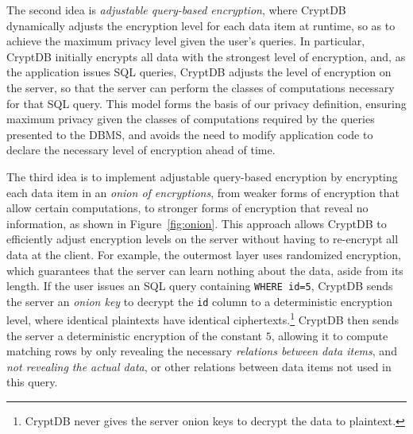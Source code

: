 The second idea is {\em adjustable query-based encryption}, where
CryptDB dynamically adjusts the encryption level for each data
item at runtime, so as to achieve the maximum privacy
level given the user's queries.  In particular, CryptDB initially
encrypts all data with the strongest level of encryption, and,
as the application issues SQL queries, CryptDB adjusts the level
of encryption on the server, so that the server can perform the
classes of computations necessary for that SQL query.  This model
forms the basis of our privacy definition, ensuring maximum privacy
given the classes of computations required by the queries presented
to the DBMS, and avoids the need to modify application code to
declare the necessary level of encryption ahead of time.

The third idea is to implement adjustable query-based encryption by encrypting
each data item in an {\em onion of encryptions}, from weaker forms of
encryption that allow certain computations, to stronger forms of
encryption that reveal no information, as shown in
Figure~\ref{fig:onion}.  This approach allows CryptDB to efficiently
adjust encryption levels on the server without having to re-encrypt
all data at the client.  For example, the outermost layer uses
randomized encryption, which guarantees that the server can learn
nothing about the data, aside from its length.  If the user issues an
SQL query containing {\tt WHERE id=5}, CryptDB sends the server an
{\em onion key} to decrypt the {\tt id} column to a deterministic
encryption level, where identical plaintexts have identical
ciphertexts.\footnote{CryptDB never gives the server onion keys to
  decrypt the data to plaintext.}  CryptDB then sends the server a
deterministic encryption of the constant $5$, allowing it to compute
matching rows by only revealing the necessary {\em relations between
  data items}, and {\em not revealing the actual data}, or other relations
between data items not used in this query.



